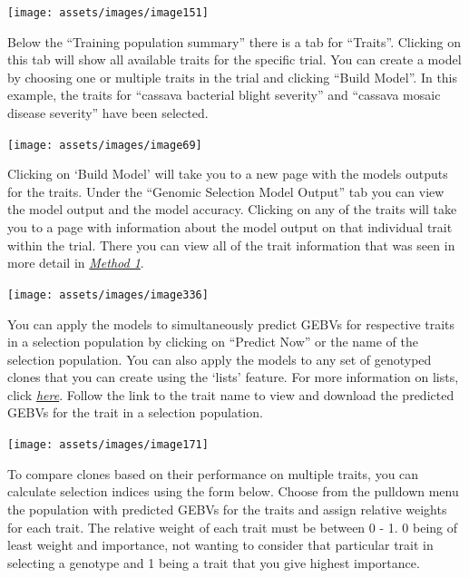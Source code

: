 \documentclass[
  12pt,
]{book}
\begin{document}
\begin{center}\texttt{[image: assets/images/image151]} \end{center}

Below the ``Training population summary'' there is a tab for ``Traits''. Clicking on this tab will show all available traits for the specific trial. You can create a model by choosing one or multiple traits in the trial and clicking ``Build Model''. In this example, the traits for ``cassava bacterial blight severity'' and ``cassava mosaic disease severity'' have been selected.

\begin{center}\texttt{[image: assets/images/image69]} \end{center}

Clicking on `Build Model' will take you to a new page with the models outputs for the traits. Under the ``Genomic Selection Model Output'' tab you can view the model output and the model accuracy. Clicking on any of the traits will take you to a page with information about the model output on that individual trait within the trial. There you can view all of the trait information that was seen in more detail in \protect\hyperlink{method-1}{\emph{Method 1}}.

\begin{center}\texttt{[image: assets/images/image336]} \end{center}

You can apply the models to simultaneously predict GEBVs for respective traits in a selection population by clicking on ``Predict Now'' or the name of the selection population. You can also apply the models to any set of genotyped clones that you can create using the `lists' feature. For more information on lists, click \protect\hyperlink{working-with-lists}{\emph{here}}. Follow the link to the trait name to view and download the predicted GEBVs for the trait in a selection population.

\begin{center}\texttt{[image: assets/images/image171]} \end{center}

To compare clones based on their performance on multiple traits, you can calculate selection indices using the form below. Choose from the pulldown menu the population with predicted GEBVs for the traits and assign relative weights for each trait. The relative weight of each trait must be between 0 - 1. 0 being of least weight and importance, not wanting to consider that particular trait in selecting a genotype and 1 being a trait that you give highest importance.
\end{document}
